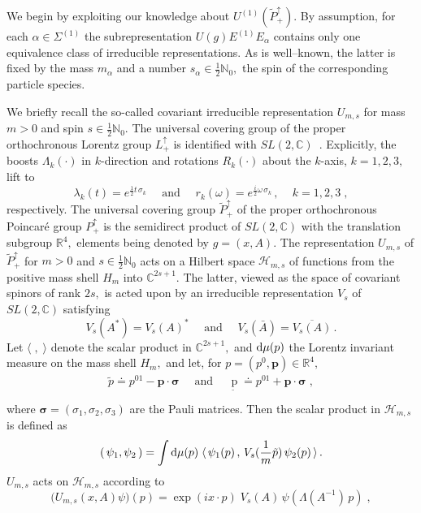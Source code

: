 \documentclass[a4paper,reqno,11pt]{amsart}
\theoremstyle{plain}
\theoremstyle{definition}
\numberwithin{equation}{section}
\newcommand{\Bb}{\mathbb{R}}
\newcommand{\Bc}{\mathbb{C}}
\newcommand{\Bn}{\mathbb{N}}
\newcommand{\calH}{{\mathcal H}}
\newcommand{\Po}{P_+^{\uparrow}}
\newcommand{\Potild}{\tilde{P}_+^{\uparrow}}
\newcommand{\Lor}{L_+^{\uparrow}}
\newcommand{\half}{{\frac{1}{2}}}
\renewcommand{\d}{{\rm d}}
\newcommand{\unity}{1}
\newcommand{\utilde}[1]{\mathop{#1}\limits_{\widetilde{\phantom{\textstyle
 #1}}}}
\newcommand{\bfp}{{\boldsymbol{p}}}
\newcommand{\Sec}{\Sigma} %
\renewcommand{\sec}{\alpha}
\newcommand{\Sece}{\Sec^{(1)}} %
\newcommand{\Esec}{E_{\sec}}
\newcommand{\msec}{{m_{\sec}}}
\newcommand{\ssec}{{s_{\sec}}}
\newcommand{\ptilde}{\tilde{p}}
\newcommand{\Ue}{U^{(1)}}
\newcommand{\Ums}{U_{m,s}}  %
\newcommand{\Hms}{\calH_{m,s}}  %
\newcommand{\Ee}{E^{(1)}}
\begin{document}
We begin by exploiting our knowledge about $\Ue(\Potild).$ By assumption, for
each $\sec\in\Sece$ the subrepresentation $U(g)\Ee\Esec$  
contains only one equivalence class of irreducible representations. As
is well--known, the  latter is  fixed by the mass $\msec$ and a number 
$\ssec\in\half\Bn_0,$ the spin of the corresponding 
particle species.  

We briefly recall the so-called covariant irreducible representation 
$\Ums$ for mass $m>0$ and spin $s\in\half\Bn_0.$ 
The universal covering group of the proper ortho\-chronous Lorentz group 
$\Lor$ is  identified with $SL(2,\Bc)$~\cite{SW}. Explicitly, 
the boosts $\Lambda_k(\cdot)$ in $k$-direction and  
rotations $R_k(\cdot)$ about the $k$-axis, $k=1,2,3,$ lift to 
\begin{equation} \label{eqBooRot}
\lambda_k(t)= e^{\frac{1}{2}t\,\sigma_k} \quad \text{ and }\quad 
r_k(\omega)= e^{\frac{i}{2}\omega\,\sigma_k}\,,\quad\,k=1,2,3 \;,   
\end{equation}
respectively. 
The universal covering group $\Potild$ of the proper ortho\-chronous 
Poin\-car\'e group $\Po$ is the semidirect product of $SL(2,\Bc)$ with
the translation subgroup $\Bb^4,$ %
elements being denoted by $g=(x,A).$ 
The representation $\Ums$ of $\Potild$ for $m>0$ and $s\in\half\Bn_0$
acts on a Hilbert space $\Hms$ of functions from the positive
mass  shell $H_m$ into $\Bc^{2s+1}.$ The latter, viewed as the space of 
covariant spinors of rank $2s,$ is acted upon by an irreducible representation
$V_s$ of $SL(2,\Bc)$ satisfying 
\[V_s(A^*)=V_s(A)^* \quad\mbox{ and } \quad
V_s(\bar{A})=\overline{V_s(A)}\,.\]
Let $\langle\;,\;\rangle$ denote the scalar product in $\Bc^{2s+1},$
and $\d \mu(p)$ the Lorentz invariant measure on the mass shell $H_m,$
and let, for $p=(p^0,\bfp)\in\Bb^4,$
\begin{align*}
\tilde{p}\doteq p^0\unity - \bfp \cdot \boldsymbol{\sigma} 
\quad \mbox{ and  } \quad 
\utilde{p}\doteq p^0\unity + \bfp \cdot \boldsymbol{\sigma} \;, 
\end{align*}
where $\boldsymbol{\sigma}=(\sigma_1,\sigma_2,\sigma_3)$ are the Pauli 
matrices. 
Then the scalar product in $\Hms$ is defined as 
\begin{equation} \label{eqScalProd}
 (\,\psi_1,\psi_2\,) = \int\d\mu(p)\;
\langle\,\psi_1(p)\,,\,V_{s}(\frac{1}{m}\ptilde)\,\psi_2(p)\, \rangle\,.  
\end{equation}
$\Ums$ acts on $\Hms$  according to 
\begin{equation}  \label{eqUms}
 \big(\Ums(x,A)\psi\big)(p) =  \exp(i x\cdot p) \; 
 V_{s}(A)\, \psi(\Lambda(A^{-1})\, p)\;, 
\end{equation} 
\end{document}
